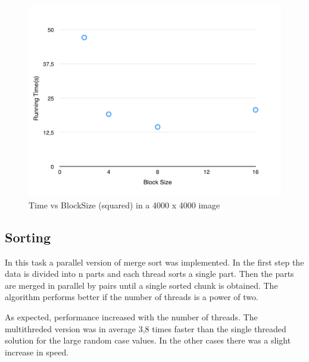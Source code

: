 \documentclass[a4paper,10pt]{article}
\begin{document}
\begin{figure}[H]
\centering
\includegraphics[width=1\textwidth]{figures/w4_timevsBlockSize}
\caption{Time vs BlockSize (squared) in a 4000 x 4000 image}
\label{fig:pca_type}
\end{figure}


\subsection{Sorting}
In this task a parallel version of merge sort was implemented. In the first step the data is divided into n parts and each thread sorts a single part. Then the parts are merged in parallel by pairs until a single sorted chunk is obtained. The algorithm performs better if the number of threads is a power of two.

As expected, performance increased with the number of threads. The multithreded version was in average 3,8 times faster than the single threaded solution for the large random case values. In the other cases there was a slight increase in speed.
\end{document}

